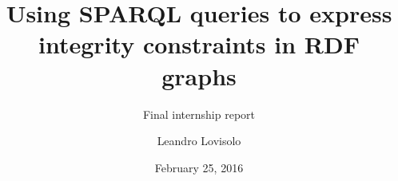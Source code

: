 \documentclass{beamer}
\title{Using SPARQL queries to express integrity constraints in RDF graphs}
\subtitle{Final internship report}
\author{
  Leandro Lovisolo
}
\date{February 25, 2016}
\institute{
  INRA SupAgro and INRIA GraphiK \\
  Montpellier, France
}
\begin{document}
\begin{frame}
  \titlepage
\end{frame}

%
%
%
%
%
%
%
%
%
%
%
%
%
%
%
%
%
%
\end{document}
